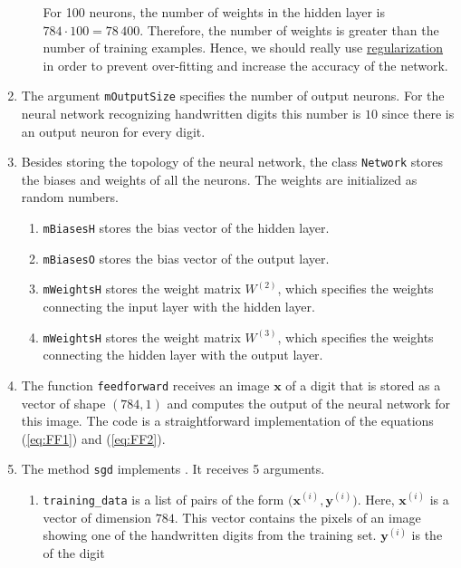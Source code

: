 \begin{enumerate}
\begin{enumerate}[(a)]
            For 100 neurons, the number of weights in the hidden layer is $784 \cdot 100 = 78\,400$.
            Therefore, the number of weights is greater than the number of training examples.  Hence,
            we should really use \href{http://neuralnetworksanddeeplearning.com/chap3.html}{regularization} in
            order to prevent over-fitting and increase the accuracy of the network.
      \end{enumerate}
\item The argument \texttt{mOutputSize} specifies the number of output neurons.  For the neural network
      recognizing handwritten digits this number is $10$ since there is an output neuron for every digit.
\item Besides storing the topology of the neural network, the class \texttt{Network} stores the biases and
      weights of all the neurons.  The weights are initialized as random numbers.
      \begin{enumerate}
      \item \texttt{mBiasesH} stores the bias vector of the hidden layer.
      \item \texttt{mBiasesO} stores the bias vector of the output layer.
      \item \texttt{mWeightsH} stores the weight matrix $W^{(2)}$, which specifies the weights connecting the
            input layer with the hidden layer.
      \item \texttt{mWeightsH} stores the weight matrix $W^{(3)}$, which specifies the weights connecting the
            hidden layer with the output layer.
      \end{enumerate}
\item The function \texttt{feedforward} receives an image $\mathbf{x}$ of a digit that is stored as a vector of
      shape $(784,1)$ and computes the output of the
      neural network for this image.  The code is a straightforward implementation of the equations (\ref{eq:FF1}) and (\ref{eq:FF2}).
\item The method \texttt{sgd} implements .   It receives 5 arguments.
      \begin{enumerate}
      \item \texttt{training\_data} is a list of pairs of the form $\bigl(\mathbf{x}^{(i)}, \mathbf{y}^{(i)}\bigr)$.
            Here, $\mathbf{x}^{(i)}$ is a vector of dimension $784$.  This vector contains the pixels of an image showing
            one of the handwritten digits from the training set.  $\mathbf{y}^{(i)}$ is the  of the digit

\end{enumerate}
\end{enumerate}
